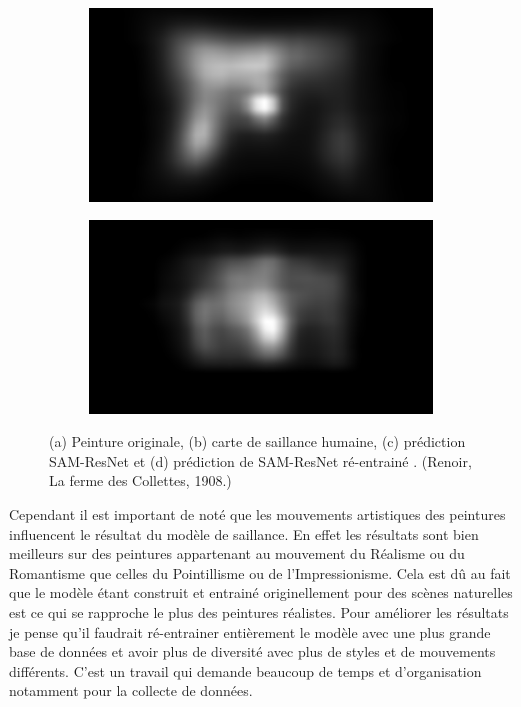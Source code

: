 \begin{figure}[ht]
    \begin{subfigure}{.49\textwidth}
        \includegraphics[width=\linewidth]{datas/samresnet/orig_La_Ferme_des_Collettes_Renoir_1908.png}
        \caption{}
    \end{subfigure}
    \begin{subfigure}{.49\textwidth}
        \includegraphics[width=\linewidth]{datas/samresnet/retrain_La_Ferme_des_Collettes_Renoir_1908.png}
        \caption{}
    \end{subfigure}
    \caption{(a) Peinture originale, (b) carte de saillance humaine, (c) prédiction SAM-ResNet et (d) prédiction de SAM-ResNet ré-entrainé . (Renoir, La ferme des Collettes, 1908.)}
    \label{fig:avantapres}
\end{figure}

\par
Cependant il est important de noté que les mouvements artistiques des peintures influencent le résultat du modèle de saillance. En effet les résultats sont bien meilleurs sur des peintures appartenant au mouvement du Réalisme ou du Romantisme que celles du Pointillisme ou de l'Impressionisme. Cela est dû au fait que le modèle étant construit et entrainé originellement pour des scènes naturelles est ce qui se rapproche le plus des peintures réalistes. Pour améliorer les résultats je pense qu'il faudrait ré-entrainer entièrement le modèle avec une plus grande base de données et avoir plus de diversité avec plus de styles et de mouvements différents. C'est un travail qui demande beaucoup de temps et d'organisation notamment pour la collecte de données.